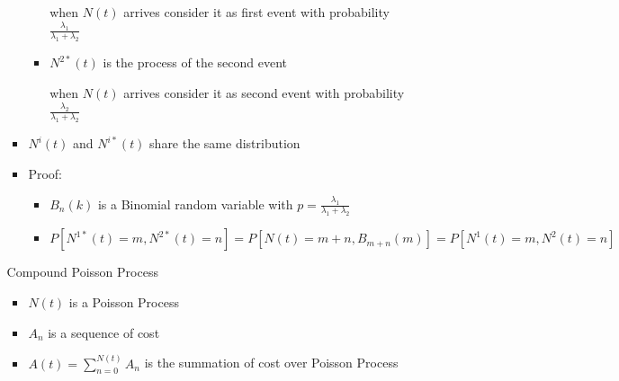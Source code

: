 \documentclass[a4paper]{article}
\begin{document}
\begin{itemize}
\begin{itemize}
\begin{itemize}
\begin{itemize}
                                when $N(t)$ arrives consider it as first event with probability $\frac{\lambda_1}{\lambda_1 + \lambda_2}$
                            \item $N^{2*}(t)$ is the process of the second event

                                when $N(t)$ arrives consider it as second event with probability $\frac{\lambda_2}{\lambda_1 + \lambda_2}$
                        \end{itemize}
                    \item $N^i(t)$ and $N^{i*}(t)$ share the same distribution
                    \item Proof:
                        \begin{itemize}
                            \item $B_n(k)$ is a Binomial random variable with $p = \frac{\lambda_1}{\lambda_1 + \lambda_2}$
                            \item $P[N^{1*}(t) = m, N^{2*}(t) = n] = P[N(t) = m + n, B_{m+n}(m)] = P[N^1(t) = m, N^2(t) = n]$
                        \end{itemize}
                \end{itemize}
                Compound Poisson Process
                \begin{itemize}
                    \item $N(t)$ is a Poisson Process
                    \item $A_n$ is a sequence of cost
                    \item $A(t) = \sum_{n=0}^{N(t)} A_n$ is the summation of cost over Poisson Process
                \end{itemize}
        \end{itemize}
\end{itemize}
\end{document}
